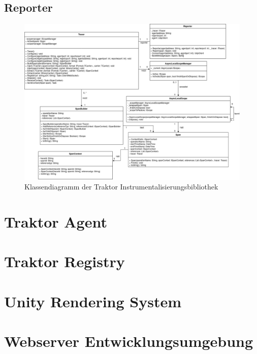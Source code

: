 \subsection{Reporter}
\label{subsection:Reporter}
\newpage
\begin{landscape}
	\begin{figure}
		\centering
		\includegraphics[scale=0.4]{img/Implementierung/TraktorKlassendiagramm.png}
		\caption[Klassendiagramm der Traktor Instrumentalisierungsbibliothek]{Klassendiagramm der Traktor Instrumentalisierungsbibliothek}
		\label{fig:TraktorKlassendiagramm}
	\end{figure}
\end{landscape}

\section{Traktor Agent}
\label{section:Traktor Agent}
\section{Traktor Registry}
\label{section:Traktor Registry}
\section{Unity Rendering System}
\label{section:Unity Rendering System}
\section{ Webserver Entwicklungsumgebung }
\label{section:Webserver Entwicklungsumgebung}
